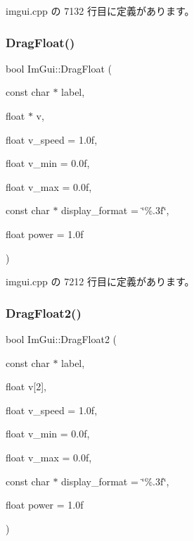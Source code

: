  imgui.\+cpp の 7132 行目に定義があります。

\mbox{\label{namespace_im_gui_ac62335909eaaa63a1ead0226e836baeb}} 
\subsubsection{\texorpdfstring{Drag\+Float()}{DragFloat()}}
{\footnotesize\ttfamily bool Im\+Gui\+::\+Drag\+Float (\begin{DoxyParamCaption}\item[{const char $\ast$}]{label,  }\item[{float $\ast$}]{v,  }\item[{float}]{v\+\_\+speed = {\ttfamily 1.0f},  }\item[{float}]{v\+\_\+min = {\ttfamily 0.0f},  }\item[{float}]{v\+\_\+max = {\ttfamily 0.0f},  }\item[{const char $\ast$}]{display\+\_\+format = {\ttfamily \char`\"{}\%.3f\char`\"{}},  }\item[{float}]{power = {\ttfamily 1.0f} }\end{DoxyParamCaption})}



 imgui.\+cpp の 7212 行目に定義があります。

\mbox{\label{namespace_im_gui_a2852e4c3b872ed5a5d28047f0290f29c}} 
\subsubsection{\texorpdfstring{Drag\+Float2()}{DragFloat2()}}
{\footnotesize\ttfamily bool Im\+Gui\+::\+Drag\+Float2 (\begin{DoxyParamCaption}\item[{const char $\ast$}]{label,  }\item[{float}]{v\mbox{[}2\mbox{]},  }\item[{float}]{v\+\_\+speed = {\ttfamily 1.0f},  }\item[{float}]{v\+\_\+min = {\ttfamily 0.0f},  }\item[{float}]{v\+\_\+max = {\ttfamily 0.0f},  }\item[{const char $\ast$}]{display\+\_\+format = {\ttfamily \char`\"{}\%.3f\char`\"{}},  }\item[{float}]{power = {\ttfamily 1.0f} }\end{DoxyParamCaption})}



